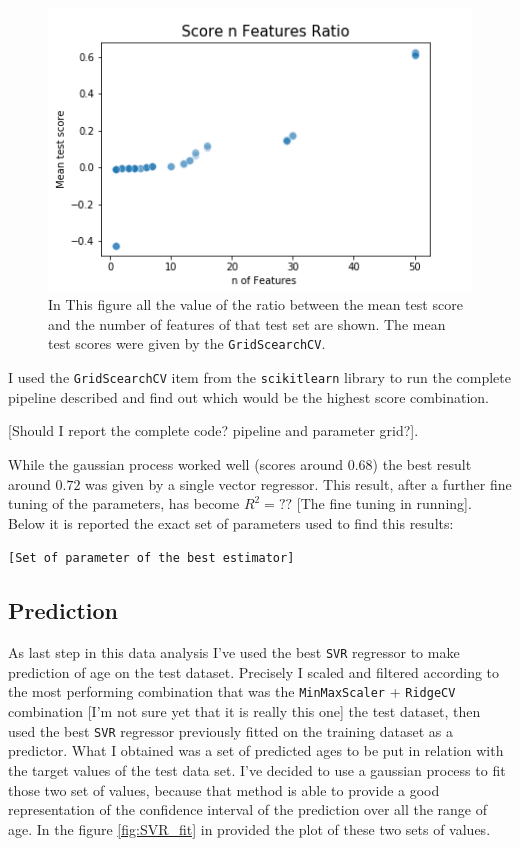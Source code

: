 \documentclass[11pt,a4paper]{report}
\begin{document}
\begin{figure}[ht!]
  \begin{center}
  \includegraphics[width=0.7\linewidth]{Score_Features_Ratio.png}
  \caption{\small{In This figure all the value of the ratio between the mean test score and the number of features of that test set are shown. The mean test scores were given by the \texttt{GridScearchCV}. }}
  \label{fig:Score_Features_Ratio}
  \end{center}
\end{figure}


 I used the \texttt{GridScearchCV} item from the \texttt{scikitlearn} library to run the complete pipeline described and find out which would be the highest score combination.

 [Should I report the complete code? pipeline and parameter grid?].

While the gaussian process worked well (scores around 0.68) the best result around $0.72$ was given by a single vector regressor. This result, after a further fine tuning of the parameters, has become $R^{2} = ??$ [The fine tuning in running]. Below it is reported the exact set of parameters used to find this results:

\texttt{[Set of parameter of the best estimator]}


\subsection*{Prediction}
As last step in this data analysis I've used the best \texttt{SVR} regressor to make prediction of age on the test dataset.
Precisely I scaled and filtered according to the most performing combination that was the \texttt{MinMaxScaler} + \texttt{RidgeCV} combination [I'm not sure yet that it is really this one] the test dataset, then used the best \texttt{SVR} regressor previously fitted on the training dataset as a predictor. What I obtained was a set of predicted ages to be put in relation with the target values of the test data set.
I've decided to use a gaussian process to fit those two set of values, because that method is able to provide a good representation of the confidence interval of the prediction over all the range of age. In the figure \ref{fig:SVR_fit} in provided the plot of these two sets of values.
\end{document}
